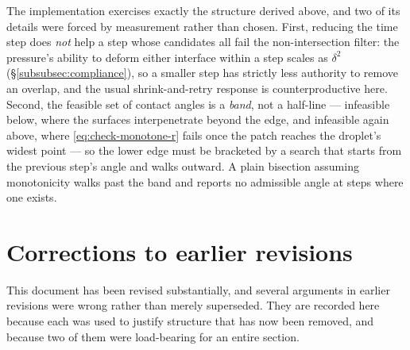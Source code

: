 The implementation exercises exactly the structure derived above, and two of its details
were forced by measurement rather than chosen. First, reducing the time step does
\emph{not} help a step whose candidates all fail the non-intersection filter: the
pressure's ability to deform either interface within a step scales as $\delta^2$
(\S\ref{subsubsec:compliance}), so a smaller step has strictly less authority to remove an
overlap, and the usual shrink-and-retry response is counterproductive here. Second, the
feasible set of contact angles is a \emph{band}, not a half-line --- infeasible below,
where the surfaces interpenetrate beyond the edge, and infeasible again above, where
\eqref{eq:check-monotone-r} fails once the patch reaches the droplet's widest point --- so
the lower edge must be bracketed by a search that starts from the previous step's angle
and walks outward. A plain bisection assuming monotonicity walks past the band and reports
no admissible angle at steps where one exists.

\section{Corrections to earlier revisions}
\label{subsec:corrections}

\hspace*{1em}This document has been revised substantially, and several arguments in earlier revisions were wrong rather than merely superseded. They are recorded here because each was used to justify structure that has now been removed, and because two of them were load-bearing for an entire section.

